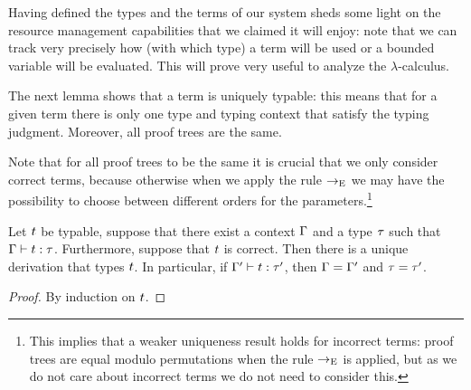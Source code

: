 Having defined the types and the terms of our system
sheds some light on the resource management capabilities that we claimed it will enjoy:
note that we can track very precisely how (\ie with which type) a term will be used or
a bounded variable will be evaluated.
This will prove very useful to analyze the $\lambda$-calculus.

The next lemma shows that a term is uniquely typable: this means that for a given term
there is only one type and typing context that satisfy the typing judgment.
Moreover, all proof trees are the same.

Note that for all proof trees to be the same it is crucial that
we only consider correct terms, because otherwise when we apply the rule
$\to_{\mathrm{E}}$ we may have the possibility to choose between different orders for the
parameters.\footnote{This implies that a weaker uniqueness result holds for
incorrect terms: proof trees are equal modulo permutations when the rule $\to_{\mathrm{E}}$
is applied, but as we do not care about incorrect terms we do not need to consider this.}

\begin{lemma}
Let $t$ be typable, \ie suppose that there exist a context $\Gamma$ and a type $\tau$ such that $\Gamma \vdash t : \tau$. Furthermore, suppose that $t$ is correct.
Then there is a unique derivation that types $t$.
In particular, if $\Gamma' \vdash t : \tau'$, then $\Gamma = \Gamma'$ and $\tau = \tau'$.
\end{lemma}
\begin{proof}
By induction on $t$.
\end{proof}

